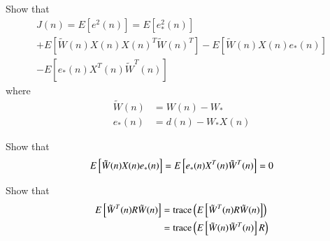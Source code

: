 \documentclass[journal,12pt,twocolumn]{IEEEtran}
\begin{document}
\begin{problem}
Show that 
\begin{multline}
J(n)=E[e^{2}(n)]
=E[e_{*}^{2}(n)]
\\
 + E[\tilde W(n)X(n) X(n)^{T} \tilde W(n)^T] 
- E[ \tilde W(n)X(n)e_{*}(n)] 
\\ 
- E[ e_{*}(n)X^{T}(n)\tilde W^T(n)]
\end{multline}
%
 where  
 \begin{align}
 \label{eq:w_tilde}
 \tilde W(n)&= W(n) - W_{*}\\
 e_{*}(n)&= d(n) - W_{*}X(n)
 \label{eq:e_star}
 \end{align}
\end{problem}
\begin{problem}
Show that
\begin{equation}
E{}\left[ \tilde W(n)X(n)e_{*}(n)\right] = E{}\left[ e_{*}(n)X^{T}(n)\tilde W^T(n)\right] = 0
\end{equation}
\end{problem}
%
\begin{problem}
Show that
\begin{align}
E{}\left[\tilde W^{T}(n) R \tilde W(n)\right] &= \text{trace}\left(E{}\left[\tilde W^{T}(n) R \tilde W(n)\right]\right)
\\
&= \text{trace}\left(E{}\left[\tilde W(n)\tilde W^{T}(n) \right]R\right)
\end{align}

\end{problem}
\end{document}
